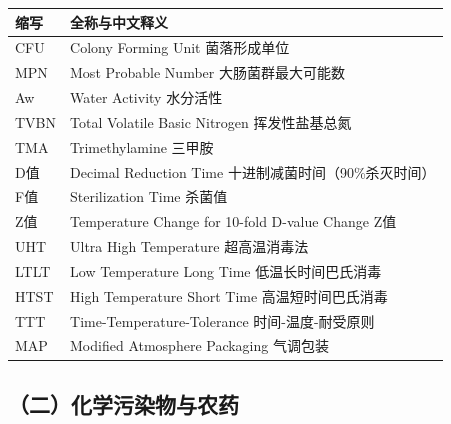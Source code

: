 \begin{table}[H]
\centering
\begin{tabularx}{\textwidth}{lX}
\toprule
\textbf{缩写} & \textbf{全称与中文释义} \\
\midrule
CFU & Colony Forming Unit \hfill 菌落形成单位 \\
MPN & Most Probable Number \hfill 大肠菌群最大可能数 \\
Aw & Water Activity \hfill 水分活性 \\
TVBN & Total Volatile Basic Nitrogen \hfill 挥发性盐基总氮 \\
TMA & Trimethylamine \hfill 三甲胺 \\
D值 & Decimal Reduction Time \hfill 十进制减菌时间（90\%杀灭时间） \\
F值 & Sterilization Time \hfill 杀菌值 \\
Z值 & Temperature Change for 10-fold D-value Change \hfill Z值 \\
UHT & Ultra High Temperature \hfill 超高温消毒法 \\
LTLT & Low Temperature Long Time \hfill 低温长时间巴氏消毒 \\
HTST & High Temperature Short Time \hfill 高温短时间巴氏消毒 \\
TTT & Time-Temperature-Tolerance \hfill 时间-温度-耐受原则 \\
MAP & Modified Atmosphere Packaging \hfill 气调包装 \\
\bottomrule
\end{tabularx}
\end{table}

\subsection*{（二）化学污染物与农药}

